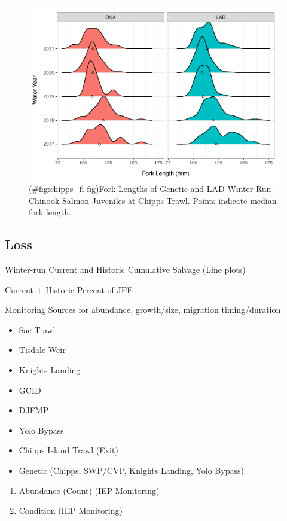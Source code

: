 \documentclass[
]{book}
\providecommand{\tightlist}{%
  \setlength{\itemsep}{0pt}\setlength{\parskip}{0pt}}
\theoremstyle{definition}
\theoremstyle{definition}
\theoremstyle{definition}
\theoremstyle{definition}
\theoremstyle{remark}
\begin{document}
\begin{figure}
\centering
\includegraphics{_main_files/figure-latex/chipps_fl-fig-1.pdf}
\caption{(\#fig:chipps\_fl-fig)Fork Lengths of Genetic and LAD Winter Run Chinook Salmon Juveniles at Chipps Trawl. Points indicate median fork length.}
\end{figure}

\hypertarget{loss}{%
\subsection{Loss}\label{loss}}

Winter-run Current and Historic Cumulative Salvage (Line plots)

Current + Historic Percent of JPE

Monitoring Sources for abundance, growth/size, migration timing/duration

\begin{itemize}
\tightlist
\item
  Sac Trawl
\item
  Tisdale Weir
\item
  Knights Landing
\item
  GCID
\item
  DJFMP
\item
  Yolo Bypass
\item
  Chipps Island Trawl (Exit)
\item
  Genetic (Chipps, SWP/CVP, Knights Landing, Yolo Bypass)
\end{itemize}

\begin{enumerate}
\def\labelenumi{\arabic{enumi}.}
\item
  Abundance (Count) (IEP Monitoring)
\item
  Condition (IEP Monitoring)
\end{enumerate}
\end{document}
